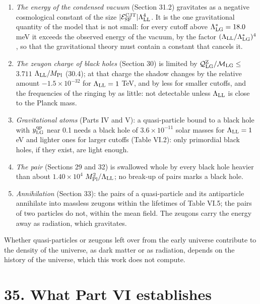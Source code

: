 \documentclass[
  10pt,
]{article}
\providecommand{\tightlist}{%
  \setlength{\itemsep}{0pt}\setlength{\parskip}{0pt}}
\begin{document}
\begin{enumerate}
\def\labelenumi{\arabic{enumi}.}
\tightlist
\item
  \emph{The energy of the condensed vacuum} (Section 31.2) gravitates as
  a negative cosmological constant of the size
  \(\lvert\mathcal E^{\rm CJT}_{\rm SF}\rvert\Lambda_{\rm LL}^4\). It is
  the one gravitational quantity of the model that is not small: for
  every cutoff above \(\Lambda^*_{\rm LG}=18.0\) meV it exceeds the
  observed energy of the vacuum, by the factor
  \((\Lambda_{\rm LL}/\Lambda^*_{\rm LG})^4\), so that the gravitational
  theory must contain a constant that cancels it.
\item
  \emph{The zeugon charge of black holes} (Section 30) is limited by
  \(\mathcal Q^{\rm Z}_{\rm LG}/\mathcal M_{\rm LG}\le\) \(3.711\)
  \(\Lambda_{\rm LL}/M_{\rm Pl}\) (30.4); at that charge the shadow
  changes by the relative amount \(-1.5\times10^{-32}\) for
  \(\Lambda_{\rm LL}=1\) TeV, and by less for smaller cutoffs, and the
  frequencies of the ringing by as little: not detectable unless
  \(\Lambda_{\rm LL}\) is close to the Planck mass.
\item
  \emph{Gravitational atoms} (Parts IV and V): a quasi-particle bound to
  a black hole with \(y^{\rm qp}_{\rm LG}\) near 0.1 needs a black hole
  of \(3.6\times10^{-11}\) solar masses for \(\Lambda_{\rm LL}=1\) eV
  and lighter ones for larger cutoffs (Table VI.2): only primordial
  black holes, if they exist, are light enough.
\item
  \emph{The pair} (Sections 29 and 32) is swallowed whole by every black
  hole heavier than about \(1.40\times10^{4}\)
  \(M_{\rm Pl}^2/\Lambda_{\rm LL}\); no break-up of pairs marks a black
  hole.
\item
  \emph{Annihilation} (Section 33): the pairs of a quasi-particle and
  its antiparticle annihilate into massless zeugons within the lifetimes
  of Table VI.5; the pairs of two particles do not, within the mean
  field. The zeugons carry the energy away as radiation, which
  gravitates.
\end{enumerate}

Whether quasi-particles or zeugons left over from the early universe
contribute to the density of the universe, as dark matter or as
radiation, depends on the history of the universe, which this work does
not compute.

\hypertarget{what-part-vi-establishes}{%
\section{35. What Part VI establishes}\label{what-part-vi-establishes}}
\end{document}
